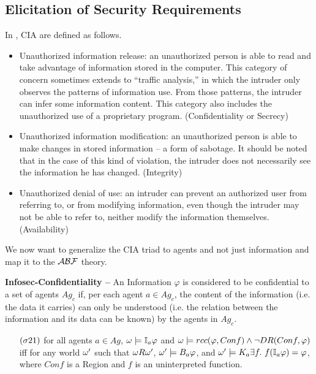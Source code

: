 \subsection{Elicitation of Security Requirements}\label{sec:properties}
In \autocite{Anderson1972report,Samonas2014cia}, CIA are defined as follows.
\begin{itemize}
	\item Unauthorized information release: an unauthorized person is able
		to read and take  advantage  of  information  stored  in  the
		computer.  This  category of concern  sometimes  extends  to
		``traffic  analysis,''  in  which  the intruder  only observes
		the  patterns  of  information  use.  From  those patterns,
		the  intruder can   infer   some   information   content.
		This category   also   includes   the unauthorized use of a
		proprietary program.  (Confidentiality or Secrecy) 
	\item Unauthorized  information  modification:  an  unauthorized person
		is  able  to make changes in stored information -- a form  of
		sabotage.  It should be noted that in the case of this kind of
		violation, the intruder does not necessarily see the
		information he has changed.  (Integrity)
	\item Unauthorized  denial  of  use:  an  intruder  can  prevent  an
		authorized  user  from referring to, or from modifying
		information, even though the intruder may not be able to refer
		to, neither modify the information themselves. (Availability)
\end{itemize}

We now want to generalize the CIA triad to agents and not just 
information and map it to the $\mathcal{A}\mathcal{B}\mathcal{F}$ theory.
\begin{definition}{\bf Infosec-Confidentiality --}\label{def:infosec-c}
	An Information $\varphi$ is considered to be confidential to a set of 
	agents $Ag_c$ if, per each agent $a\in Ag_c$, the content of the
	information (i.e. the data it carries) can only be understood (i.e. the relation
	between the information and its data can be known) by the
	agents in $Ag_c$.

	\begin{itemize}
		\item[$(\sigma21)$] for all agents $a\in Ag$,
			$\omega\models\mathbb{I}_{a}{\varphi}$ and
			$\omega\models rcc(\varphi,Conf) \wedge
			\neg DR(Conf,\varphi)$ iff for any world $\omega'$
			such that $\omega R\omega'$,
			$\omega'\models B_{a}\varphi$, and
			$\omega'\models K_{a}\exists f.~
			f(\mathbb{I}_{a}{\varphi})=\varphi$, where 
			$Conf$ is a Region and $f$ is an uninterpreted function.
	\end{itemize}
\end{definition}

